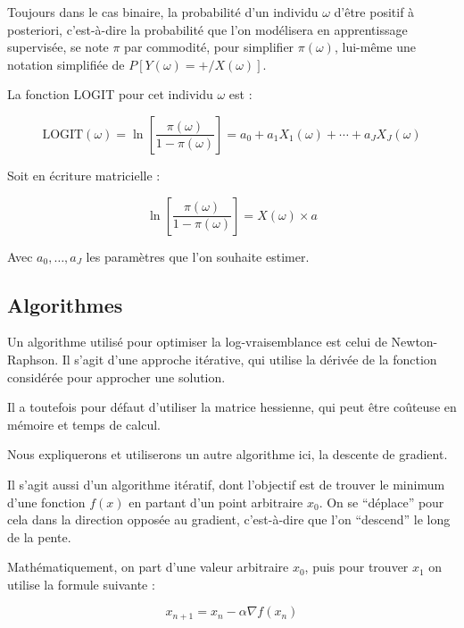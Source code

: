 \documentclass[10pt,french]{report}
\begin{document}
    Toujours dans le cas binaire, la probabilité d'un individu $\omega$ d'être positif à posteriori, c'est-à-dire la probabilité que l'on modélisera en apprentissage supervisée, se note $\pi$ par commodité, pour simplifier $\pi\left(\omega\right)$, lui-même une notation simplifiée de $P\left[Y\left(\omega\right)=+/X\left(\omega\right)\right]$.

    La fonction LOGIT pour cet individu $\omega$ est :

    \begin{equation}
        \text{LOGIT}(\omega) = \ln\left[\frac{\pi(\omega)}{1-\pi(\omega)}\right] = a_0 + a_1X_1\left(\omega\right) + \cdots + a_JX_J\left(\omega\right)
    \end{equation}

    Soit en écriture matricielle :

    \begin{equation}
        \ln\left[\frac{\pi(\omega)}{1-\pi(\omega)}\right] = X\left(\omega\right) \times a
    \end{equation}

    Avec $a_0, \ldots, a_J$ les paramètres que l'on souhaite estimer.

	\subsection{Algorithmes}

    Un algorithme utilisé pour optimiser la log-vraisemblance est celui de Newton-Raphson. Il s'agit d'une approche itérative, qui utilise la dérivée de la fonction considérée pour approcher une solution.

    Il a toutefois pour défaut d'utiliser la matrice hessienne, qui peut être coûteuse en mémoire et temps de calcul.

    Nous expliquerons et utiliserons un autre algorithme ici, la descente de gradient.

    Il s'agit aussi d'un algorithme itératif, dont l'objectif est de trouver le minimum d'une fonction $f\left(x\right)$ en partant d'un point arbitraire $x_0$. On se \enquote{déplace} pour cela dans la direction opposée au gradient, c'est-à-dire que l'on \enquote{descend} le long de la pente.

    Mathématiquement, on part d'une valeur arbitraire $x_0$, puis pour trouver $x_1$ on utilise la formule suivante :

    \begin{equation}
        x_{n+1} = x_n - \alpha \nabla f\left(x_n\right)
    \end{equation}
\end{document}
